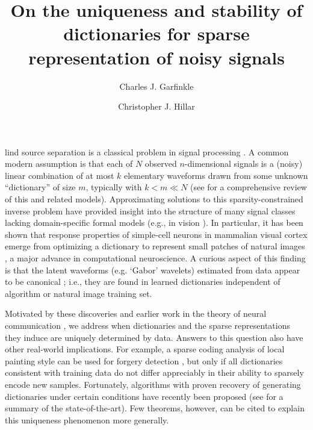 \documentclass[9pt,twocolumn]{pnas-new}
\title{On the uniqueness and stability of dictionaries for sparse representation of noisy signals}
\author[a,1]{Charles J. Garfinkle}
\author[a,1]{Christopher J. Hillar}
\affil[a]{Redwood Center for Theoretical Neuroscience, Berkeley, CA, USA}
\begin{document}
\verticaladjustment{-2pt}

\maketitle
\thispagestyle{firststyle}

lind source separation is a classical problem in signal processing \cite{sato1975method}.
A common modern assumption is that each of $N$ observed $n$-dimensional signals is a (noisy) linear combination of at most $k$ elementary waveforms drawn from some unknown ``dictionary'' of size $m$, typically with $k < m \ll N$ (see \cite{Zhang15} for a comprehensive review of this and related models).
Approximating solutions to this sparsity-constrained inverse problem have provided insight into the structure of many signal classes lacking domain-specific formal models (e.g., in vision \cite{wang2015sparse}).  In particular, it has been shown that response properties of simple-cell neurons in mammalian visual cortex emerge from optimizing a dictionary to represent small patches of natural images \cite{Olshausen96, hurri1996image, bell1997independent, van1998independent}, a major advance in computational neuroscience. A curious aspect of this finding is that the latent waveforms (e.g. `Gabor' wavelets) estimated from data appear to be canonical \cite{donoho2001can};
i.e., they are found in learned dictionaries independent of algorithm or natural image training set.

Motivated by these discoveries and earlier work in the theory of neural communication \cite{Coulter10, Isely10}, we address when dictionaries and the sparse representations they induce are uniquely determined by data.  Answers to this question also have other real-world implications.  For example, a sparse coding analysis of local painting style can be used for forgery detection \cite{hughes2010, Olshausen10}, but only if all dictionaries consistent with training data do not differ appreciably in their ability to sparsely encode new samples. 
Fortunately, algorithms with proven recovery of generating dictionaries under certain 
conditions have recently been proposed (see \cite[Sec.~I-E]{Sun16} for a summary of the state-of-the-art). Few theorems, however, can be cited to explain this uniqueness phenomenon more generally.
\end{document}
